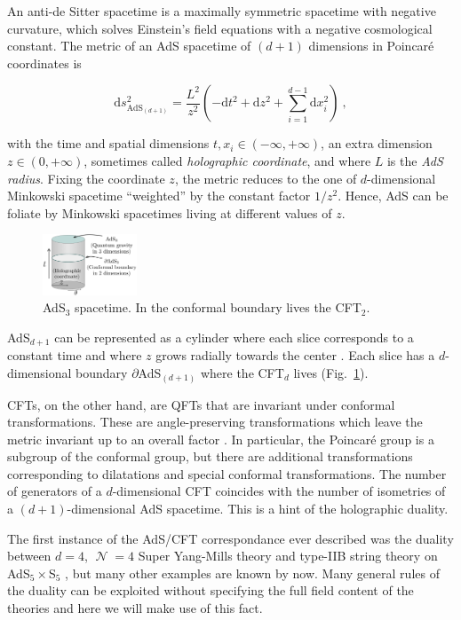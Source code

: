 \documentclass[twocolumn]{revtex4-2}
\providecommand{\eq}[2]{
    \begin{equation}
        #2
    \label{eq:#1}
    \end{equation}
}
\DeclareMathOperator{\calN}{\mathcal{N}}
\begin{document}
An anti-de Sitter spacetime is a maximally symmetric spacetime with negative curvature, which solves Einstein's field equations with a negative cosmological constant. The metric of an AdS spacetime of $(d+1)$ dimensions in Poincar\'e coordinates is 
\eq{AdS_PP-metric}{
    \mathrm{d} s_{\text{AdS}_{(d+1)}}^2 = \frac{L^2}{z^2} \left( -\mathrm{d} t^2 + \mathrm{d} z^2 + \sum_{i=1}^{d-1} \mathrm{d} x_i^2 \right) \ ,
}
with the time and spatial dimensions $t , x_i \in (-\infty,+\infty)$, an extra dimension $z \in (0,+\infty)$, sometimes called \emph{holographic coordinate}, and where $L$ is the \emph{AdS radius}. Fixing the coordinate $z$, the metric reduces to the one of $d$-dimensional Minkowski spacetime ``weighted'' by the constant factor $1/z^2$. Hence, AdS can be foliate by Minkowski spacetimes living at different values of $z$.


\begin{figure}
    \centering
    \includegraphics[width=0.25\textwidth]{../imatges/AdS_Cylindric.png}
\caption{AdS$_3$ spacetime. In the conformal boundary lives the CFT$_2$.}
\label{fig:AdS}
\end{figure}

AdS$_{d+1}$ can be represented as a cylinder where each slice corresponds to a constant time and where  $z$ grows radially towards the center \cite{hawking_large_2008}. Each slice has a $d$-dimensional boundary $\partial$AdS$_{(d+1)}$ where the CFT$_d$ lives (Fig.~\ref{fig:AdS}).

CFTs, on the other hand, are QFTs that are invariant under conformal transformations. These are angle-preserving transformations which leave the metric invariant up to an overall factor \cite{di_francesco_conformal_1997}. In particular, the Poincar\'e group is a subgroup of the conformal group, but there are additional transformations corresponding to dilatations and special conformal transformations. The number of generators of a $d$-dimensional CFT coincides with the number of isometries of a $(d+1)$-dimensional AdS spacetime. This is a hint of the holographic duality.

The first instance of the AdS/CFT correspondance ever described was the duality between $d=4$, $\calN=4$ Super Yang-Mills theory and type-IIB string theory on AdS$_5 \times $S$_5$ \cite{maldacena_large_1999}, but many other examples are known by now. Many general rules of the duality can be exploited without specifying the full field content of the theories and here we will make use of this fact.
\end{document}
